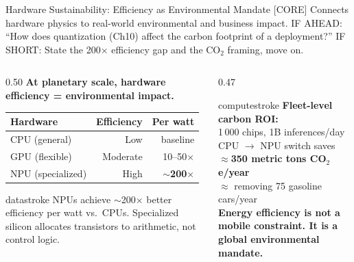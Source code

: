 \documentclass[aspectratio=169, 12pt]{beamer}
\begin{document}
\begin{frame}{Hardware Sustainability: Efficiency as Environmental Mandate}
{%
[CORE] Connects hardware physics to real-world environmental and business impact.
IF AHEAD: ``How does quantization (Ch10) affect the carbon footprint of a deployment?''
IF SHORT: State the 200$\times$ efficiency gap and the CO$_2$ framing, move on.
}

\footnotesize
\begin{columns}[T]
  \begin{column}{0.50\textwidth}
    \textbf{At planetary scale, hardware efficiency = environmental impact.}

    \vspace{0.05cm}
    {\scriptsize
    \begin{tabular}{@{}lrr@{}}
      \toprule
      \textbf{Hardware} & \textbf{Efficiency} & \textbf{Per watt} \\
      \midrule
      CPU (general) & Low & baseline \\
      GPU (flexible) & Moderate & 10--50$\times$ \\
      NPU (specialized) & High & $\sim$\textbf{200$\times$} \\
      \bottomrule
    \end{tabular}
    }

    \vspace{0.05cm}
    \begin{mlsyscard}{datastroke}
    {\scriptsize NPUs achieve $\sim$200$\times$ better efficiency per watt vs.\ CPUs. Specialized silicon allocates transistors to arithmetic, not control logic.}
    \end{mlsyscard}
  \end{column}
  \begin{column}{0.47\textwidth}
    \begin{mlsyscard}{computestroke}
    {\scriptsize \textbf{Fleet-level carbon ROI:}\\[0.03cm]
    1\,000 chips, 1B inferences/day\\[0.02cm]
    CPU $\to$ NPU switch saves\\
    $\approx$\textbf{350 metric tons CO$_2$e/year}\\[0.02cm]
    $\approx$ removing 75 gasoline cars/year\\[0.03cm]
    \textcolor{errorstroke}{\textbf{Energy efficiency is not a mobile constraint. It is a global environmental mandate.}}
    }
    \end{mlsyscard}

    \vspace{0.05cm}
  \end{column}
\end{columns}

\end{frame}
\end{document}
